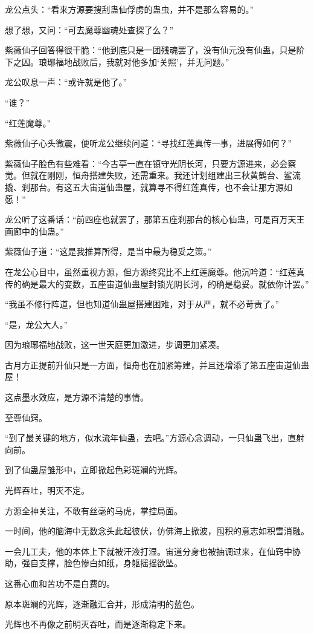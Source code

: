 \begin{this_body}
龙公点头：“看来方源要搜刮蛊仙俘虏的蛊虫，并不是那么容易的。”

想了想，又问：“可去魔尊幽魂处查探了么？”

紫薇仙子回答得很干脆：“他到底只是一团残魂罢了，没有仙元没有仙蛊，只是阶下之囚。琅琊福地战败后，我就对他多加‘关照’，并无问题。”

龙公叹息一声：“或许就是他了。”

“谁？”

“红莲魔尊。”

紫薇仙子心头微震，便听龙公继续问道：“寻找红莲真传一事，进展得如何？”

紫薇仙子脸色有些难看：“今古亭一直在镇守光阴长河，只要方源进来，必会察觉。但就在刚刚，恒舟搭建失败，还需重来。我还计划组建出三秋黄鹤台、鲨流撬、刹那台。有这五大宙道仙蛊屋，就算寻不得红莲真传，也不会让那方源如愿！”

龙公听了这番话：“前四座也就罢了，那第五座刹那台的核心仙蛊，可是百万天王画廊中的仙蛊。”

紫薇仙子道：“这是我推算所得，是当中最为稳妥之策。”

在龙公心目中，虽然重视方源，但方源终究比不上红莲魔尊。他沉吟道：“红莲真传的确是最大的变数，五座宙道仙蛊屋封锁光阴长河，的确是稳妥。就依你计罢。”

“我虽不修行阵道，但也知道仙蛊屋搭建困难，对于从严，就不必苛责了。”

“是，龙公大人。”

因为琅琊福地战败，这一世天庭更加激进，步调更加紧凑。

古月方正提前升仙只是一方面，恒舟也在加紧筹建，并且还增添了第五座宙道仙蛊屋！

这点墨水效应，是方源不清楚的事情。

至尊仙窍。

“到了最关键的地方，似水流年仙蛊，去吧。”方源心念调动，一只仙蛊飞出，直射向前。

到了仙蛊屋雏形中，立即掀起色彩斑斓的光辉。

光辉吞吐，明灭不定。

方源全神关注，不敢有丝毫的马虎，掌控局面。

一时间，他的脑海中无数念头此起彼伏，仿佛海上掀波，囤积的意志如积雪消融。

一会儿工夫，他的本体上下就被汗液打湿。宙道分身也被抽调过来，在仙窍中协助，强自支撑，脸色惨白如纸，身躯摇摇欲坠。

这番心血和苦功不是白费的。

原本斑斓的光辉，逐渐融汇合并，形成清明的蓝色。

光辉也不再像之前明灭吞吐，而是逐渐稳定下来。


\end{this_body}
